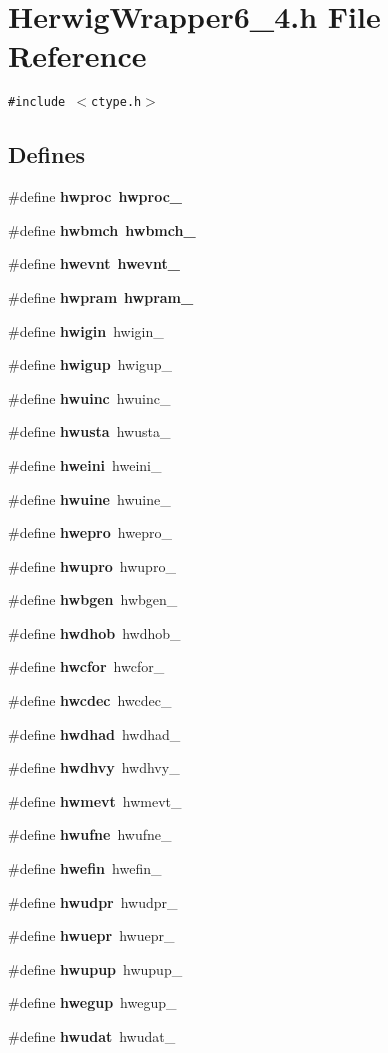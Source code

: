 \section{Herwig\-Wrapper6\_\-4.h File Reference}
\label{HerwigWrapper6__4_8h}
{\tt \#include $<$ctype.h$>$}\par
\subsection*{Defines}
\begin{CompactItemize}
\item 
\#define {\bf hwproc}~{\bf hwproc\_\-}
\item 
\#define {\bf hwbmch}~{\bf hwbmch\_\-}
\item 
\#define {\bf hwevnt}~{\bf hwevnt\_\-}
\item 
\#define {\bf hwpram}~{\bf hwpram\_\-}
\item 
\#define {\bf hwigin}~hwigin\_\-
\item 
\#define {\bf hwigup}~hwigup\_\-
\item 
\#define {\bf hwuinc}~hwuinc\_\-
\item 
\#define {\bf hwusta}~hwusta\_\-
\item 
\#define {\bf hweini}~hweini\_\-
\item 
\#define {\bf hwuine}~hwuine\_\-
\item 
\#define {\bf hwepro}~hwepro\_\-
\item 
\#define {\bf hwupro}~hwupro\_\-
\item 
\#define {\bf hwbgen}~hwbgen\_\-
\item 
\#define {\bf hwdhob}~hwdhob\_\-
\item 
\#define {\bf hwcfor}~hwcfor\_\-
\item 
\#define {\bf hwcdec}~hwcdec\_\-
\item 
\#define {\bf hwdhad}~hwdhad\_\-
\item 
\#define {\bf hwdhvy}~hwdhvy\_\-
\item 
\#define {\bf hwmevt}~hwmevt\_\-
\item 
\#define {\bf hwufne}~hwufne\_\-
\item 
\#define {\bf hwefin}~hwefin\_\-
\item 
\#define {\bf hwudpr}~hwudpr\_\-
\item 
\#define {\bf hwuepr}~hwuepr\_\-
\item 
\#define {\bf hwupup}~hwupup\_\-
\item 
\#define {\bf hwegup}~hwegup\_\-
\item 
\#define {\bf hwudat}~hwudat\_\-
\end{CompactItemize}
